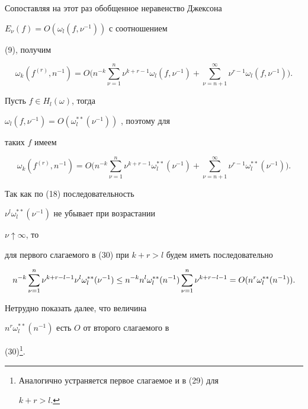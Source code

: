 \begin{pf}


Сопоставляя на этот раз обобщенное неравенство Джексона


$E_\nu(f)=O(\omega_l(f,\nu^{-1}))$ с соотношением


(9), получим


\begin{equation}


\omega_k(f^{(r)},n^{-1})=O\biggl(n^{-k}


\sum^n_{\nu=1}\nu^{k+r-1}\omega_l(f,\nu^{-1})+\sum^\infty_{\nu=n+1}


\nu^{r-1}\omega_l(f,\nu^{-1})\biggr).


\end{equation}


Пусть $f\in H_l(\omega)$, тогда


$\omega_l(f,\nu^{-1})=O(\omega^{**}_l(\nu^{-1}))$ \cite{St}, поэтому для


таких $f$ имеем


\begin{equation}


\omega_k(f^{(r)},n^{-1})=O\biggl(n^{-k}\sum^n_{\nu=1}


\nu^{k+r-1}\omega^{**}_l(\nu^{-1})+\sum^\infty_{\nu=n+1}


\nu^{r-1}\omega^{**}_l(\nu^{-1})\biggr).


\end{equation}


Так как по (18) последовательность


$\nu^l\omega^{**}_l(\nu^{-1})$ не убывает при возрастании


$\nu\uparrow\infty$, то


для первого слагаемого в (30) при $k+r>l$ будем иметь последовательно


$$


n^{-k}\sum^n_{\nu=1}\nu^{k+r-l-1}\nu^l\omega^{**}_l(\nu^{-1})\le \\


n^{-k}n^l\omega^{**}_l(n^{-1})\sum^n_{\nu=1}


\nu^{k+r-l-1}=O(n^r\omega^{**}_l(n^{-1})).


$$


Нетрудно показать далее, что величина


$n^r\omega^{**}_l(n^{-1})$ есть $O$ от второго слагаемого в


(30)\footnote{Аналогично устраняется первое слагаемое и в (29) для


$k+r>l$.}.



\end{pf}
